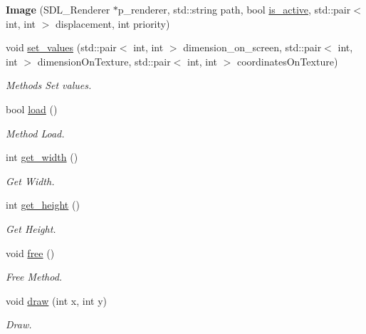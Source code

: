 \begin{DoxyCompactItemize}
\item 
{\bfseries Image} (S\+D\+L\+\_\+\+Renderer $\ast$p\+\_\+renderer, std\+::string path, bool \hyperlink{classengine_1_1_component_ae1a97027b9862ee3e41e6566501d765e}{is\+\_\+active}, std\+::pair$<$ int, int $>$ displacement, int priority)\hypertarget{classengine_1_1_image_aa3429cf7f78e43a8c28a536f6849716c}{}\label{classengine_1_1_image_aa3429cf7f78e43a8c28a536f6849716c}

\item 
void \hyperlink{classengine_1_1_image_aa0ed04e99b416fb5780f0c7ceb99f843}{set\+\_\+values} (std\+::pair$<$ int, int $>$ dimension\+\_\+on\+\_\+screen, std\+::pair$<$ int, int $>$ dimension\+On\+Texture, std\+::pair$<$ int, int $>$ coordinates\+On\+Texture)
\begin{DoxyCompactList}\small\item\em Methods Set values. \end{DoxyCompactList}\item 
bool \hyperlink{classengine_1_1_image_a1a393960f7402515428bd982c32f59af}{load} ()
\begin{DoxyCompactList}\small\item\em Method Load. \end{DoxyCompactList}\item 
int \hyperlink{classengine_1_1_image_a4eeafefc0bae9658ffe8877c5cf681e7}{get\+\_\+width} ()
\begin{DoxyCompactList}\small\item\em Get Width. \end{DoxyCompactList}\item 
int \hyperlink{classengine_1_1_image_a5082f1fdc63e6bb76a105348e72e2e02}{get\+\_\+height} ()
\begin{DoxyCompactList}\small\item\em Get Height. \end{DoxyCompactList}\item 
void \hyperlink{classengine_1_1_image_aa70272a861bcaa5297e6967c9106197f}{free} ()
\begin{DoxyCompactList}\small\item\em Free Method. \end{DoxyCompactList}\item 
void \hyperlink{classengine_1_1_image_a45ce17ceb8619e732f2d09ec6d1cc1b9}{draw} (int x, int y)
\begin{DoxyCompactList}\small\item\em Draw. \end{DoxyCompactList}\end{DoxyCompactItemize}
